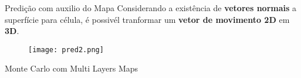 
\begin{frame}[t]{Predição com auxilio do Mapa}
    Considerando a existência de \textbf{vetores normais} a superfície para célula, é possivél tranformar um \textbf{vetor de movimento 2D}  em \textbf{3D}.
    
    \begin{figure}

        \texttt{[image: pred2.png]}%
        
    
    \end{figure}
\end{frame}


%    
%
%        
%    


\begin{frame}[c]{Monte Carlo com Multi Layers Maps} 
    \transdissolve[duration=0.5]
   
    \begin{center}
    \end{center}
    
   
%
\end{frame}


\begin{frame}[c]{} 
    \transdissolve[duration=0.5]
   
    \begin{center}
    \end{center}
    
   
%
\end{frame}

